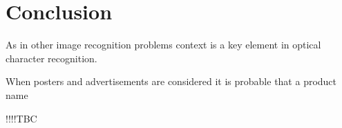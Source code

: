 \chapter{Conclusion}

As in other image recognition problems context is a key element in optical character recognition. 

When posters and advertisements are considered it is probable that a product name 

!!!!TBC